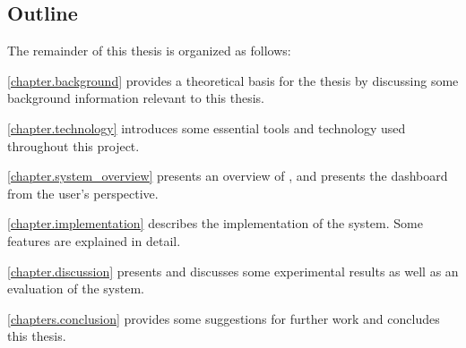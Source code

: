 
\subsection{Outline}

The remainder of this thesis is organized as follows:

\begin{Description}
  \item[\betterfakesc{Chapter} \ref{chapter.background}]\indent provides a theoretical basis for the thesis by discussing some background information relevant to this thesis.
  \item[\betterfakesc{Chapter} \ref{chapter.technology}]introduces some essential tools and technology used throughout this project.
  \item[\betterfakesc{Chapter} \ref{chapter.system_overview}]presents an overview of \toolname, and presents the dashboard from the user's perspective.
  \item[\betterfakesc{Chapter} \ref{chapter.implementation}]describes the implementation of the system. Some features are explained in detail.
  \item[\betterfakesc{Chapter} \ref{chapter.discussion}]presents and discusses some experimental results as well as an evaluation of the system.
  \item[\betterfakesc{Chapter} \ref{chapters.conclusion}]provides some suggestions for further work and concludes this thesis.
\end{Description}